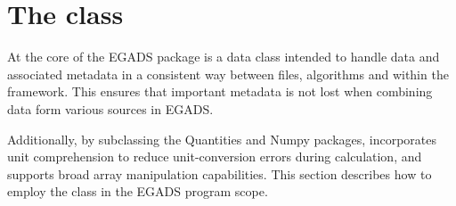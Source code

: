 \documentclass[a4paper,10pt,openany,english]{sphinxmanual}
\begin{document}
\section{The  class}
\label{tutorial:the-egadsdata-class}
At the core of the EGADS package is a data class intended to handle data and associated metadata in a consistent way between files, algorithms and within the framework. This ensures that important metadata is not lost when combining data form various sources in EGADS.

Additionally, by subclassing the Quantities and Numpy packages, {\hyperref[egadsapi:egads.core.egads_core.EgadsData]{}} incorporates unit comprehension to reduce unit-conversion errors during calculation, and supports broad array manipulation capabilities. This section describes how to employ the {\hyperref[egadsapi:egads.core.egads_core.EgadsData]{}} class in the EGADS program scope.
\end{document}
